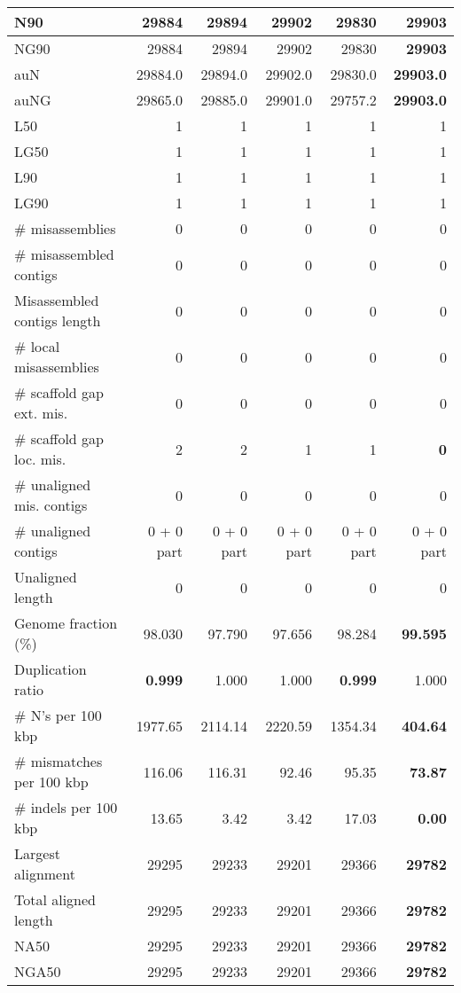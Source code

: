 \documentclass[12pt,a4paper]{article}
\begin{document}
\begin{table}[ht]
\begin{center}
\begin{tabular}{|l*{5}{|r}|}
N90 & 29884 & 29894 & 29902 & 29830 & {\bf 29903} \\ \hline
NG90 & 29884 & 29894 & 29902 & 29830 & {\bf 29903} \\ \hline
auN & 29884.0 & 29894.0 & 29902.0 & 29830.0 & {\bf 29903.0} \\ \hline
auNG & 29865.0 & 29885.0 & 29901.0 & 29757.2 & {\bf 29903.0} \\ \hline
L50 & 1 & 1 & 1 & 1 & 1 \\ \hline
LG50 & 1 & 1 & 1 & 1 & 1 \\ \hline
L90 & 1 & 1 & 1 & 1 & 1 \\ \hline
LG90 & 1 & 1 & 1 & 1 & 1 \\ \hline
\# misassemblies & 0 & 0 & 0 & 0 & 0 \\ \hline
\# misassembled contigs & 0 & 0 & 0 & 0 & 0 \\ \hline
Misassembled contigs length & 0 & 0 & 0 & 0 & 0 \\ \hline
\# local misassemblies & 0 & 0 & 0 & 0 & 0 \\ \hline
\# scaffold gap ext. mis. & 0 & 0 & 0 & 0 & 0 \\ \hline
\# scaffold gap loc. mis. & 2 & 2 & 1 & 1 & {\bf 0} \\ \hline
\# unaligned mis. contigs & 0 & 0 & 0 & 0 & 0 \\ \hline
\# unaligned contigs & 0 + 0 part & 0 + 0 part & 0 + 0 part & 0 + 0 part & 0 + 0 part \\ \hline
Unaligned length & 0 & 0 & 0 & 0 & 0 \\ \hline
Genome fraction (\%) & 98.030 & 97.790 & 97.656 & 98.284 & {\bf 99.595} \\ \hline
Duplication ratio & {\bf 0.999} & 1.000 & 1.000 & {\bf 0.999} & 1.000 \\ \hline
\# N's per 100 kbp & 1977.65 & 2114.14 & 2220.59 & 1354.34 & {\bf 404.64} \\ \hline
\# mismatches per 100 kbp & 116.06 & 116.31 & 92.46 & 95.35 & {\bf 73.87} \\ \hline
\# indels per 100 kbp & 13.65 & 3.42 & 3.42 & 17.03 & {\bf 0.00} \\ \hline
Largest alignment & 29295 & 29233 & 29201 & 29366 & {\bf 29782} \\ \hline
Total aligned length & 29295 & 29233 & 29201 & 29366 & {\bf 29782} \\ \hline
NA50 & 29295 & 29233 & 29201 & 29366 & {\bf 29782} \\ \hline
NGA50 & 29295 & 29233 & 29201 & 29366 & {\bf 29782} \\ \hline

\end{tabular}
\end{center}
\end{table}
\end{document}
